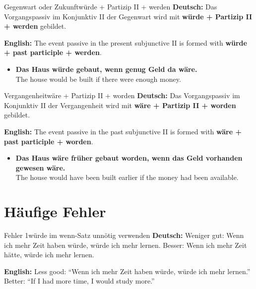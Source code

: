 \documentclass[a4paper,11pt]{article}
\newcommand{\GermanText}[1]{\textbf{Deutsch: }#1\par}
\newcommand{\EnglishText}[1]{{\small\color{SoftGray}\textbf{English: }#1\par}}
\newcommand{\ExampleItem}[2]{\item \textbf{#1}\\{\small\color{SoftGray}#2}}
\begin{document}
        \begin{grammarentry}{Gegenwart oder Zukunft}{würde + Partizip II + werden}
            \GermanText{Das Vorgangspassiv im Konjunktiv II der Gegenwart wird mit \textbf{würde + Partizip II + werden} gebildet.}
            \EnglishText{The event passive in the present subjunctive II is formed with \textbf{würde + past participle + werden}.}
        \end{grammarentry}

        \begin{exbox}
            \begin{itemize}
                \ExampleItem{Das Haus würde gebaut, wenn genug Geld da wäre.}{The house would be built if there were enough money.}
            \end{itemize}
        \end{exbox}

        \begin{grammarentry}{Vergangenheit}{wäre + Partizip II + worden}
            \GermanText{Das Vorgangspassiv im Konjunktiv II der Vergangenheit wird mit \textbf{wäre + Partizip II + worden} gebildet.}
            \EnglishText{The event passive in the past subjunctive II is formed with \textbf{wäre + past participle + worden}.}
        \end{grammarentry}

        \begin{exbox}
            \begin{itemize}
                \ExampleItem{Das Haus wäre früher gebaut worden, wenn das Geld vorhanden gewesen wäre.}{The house would have been built earlier if the money had been available.}
            \end{itemize}
        \end{exbox}

    \section{Häufige Fehler}

        \begin{grammarentry}{Fehler 1}{würde im wenn-Satz unnötig verwenden}
            \GermanText{Weniger gut: \glqq Wenn ich mehr Zeit haben würde, würde ich mehr lernen.\grqq{} Besser: \glqq Wenn ich mehr Zeit hätte, würde ich mehr lernen.\grqq}
            \EnglishText{Less good: ``Wenn ich mehr Zeit haben würde, würde ich mehr lernen.'' Better: ``If I had more time, I would study more.''}
        \end{grammarentry}
\end{document}
